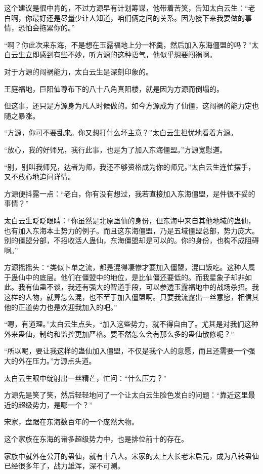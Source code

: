 \begin{this_body}
这个建议是很中肯的，不过方源早有计划筹谋，他带着苦笑，告知太白云生：“老白啊，你最好还是尽量少让人知道，咱们俩之间的关系。因为接下来我要做的事情，恐怕会拖累你的。”

“啊？你此次来东海，不是想在玉露福地上分一杯羹，然后加入东海僵盟的吗？”太白云生立即感到有些不妙，听方源的这种语气，他似乎想要闯祸啊。

对于方源的闯祸能力，太白云生是深刻印象的。

王庭福地，巨阳仙尊布下的八十八角真阳楼，就是因为方源而倒塌的。

但这事，还只是方源身为凡人时候做的。如今方源成为了仙僵，这闯祸的能力定也随之暴涨。

“方源，你可不要乱来。你又想打什么坏主意？”太白云生担忧地看着方源。

“放心，我的好师兄，我行此事，也是为了加入东海僵盟。”方源宽慰道。

“别，别叫我师兄，达者为师，我还不够资格成为你的师兄。”太白云生连忙摆手，又不放心地追问详情。

方源便抖露一点：“老白，你有没有想过，我若直接加入东海僵盟，是件很不妥的事情？”

太白云生眨眨眼睛：“你虽然是北原蛊仙的身份，但东海中来自其他地域的蛊仙，也有加入东海本土势力的例子。而且这东海僵盟，乃是五域僵盟总部，势力庞大。别的僵盟分部，不招收活人蛊仙，东海僵盟却是可以的。你的身份，也构不成阻碍啊。”

方源摇摇头：“类似卜单之流，都是混得凄惨才要加入僵盟，混口饭吃。这种人属于蛊仙中的底层。他们在僵盟中的地位，是比仙僵还要低的。而我星象子却非如此。我有仙蛊不谈，我还有强大的智道手段，可以参透玉露福地中的战场杀招。我这样的人物，就算怎么混，也不至于加入僵盟啊。只要我流露出一丝意愿，相信其他的正道势力也是欢迎我加入的吧。”

“嗯，有道理。”太白云生点头，“加入这些势力，就不得自由了。尤其是对我们这种外来蛊仙，制约和监控更加严格。要不然怎么会有那么多的蛊仙散修呢？”

“所以呢，要让我这样的蛊仙加入僵盟，不仅是我个人的意愿，而且还需要一个强大的外在压力。”方源点头道。

太白云生眼中绽射出一丝精芒，忙问：“什么压力？”

方源先是笑了笑，然后轻轻地问了一个让太白云生脸色发白的问题：“靠近这里最近的超级势力，是哪一个？”

宋家，盘踞在东海数百年的一个庞然大物。

这个家族在东海的诸多超级势力中，也是排位前十的存在。

家族中就外在公开的蛊仙，就有十八人。宋家的太上大长老宋启元，成为八转蛊仙已经很多年了，战力雄浑，深不可测。


\end{this_body}
